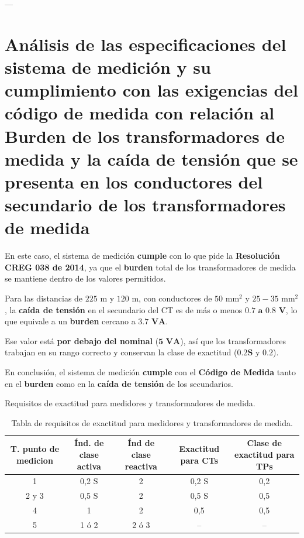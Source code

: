 ---
\section{Análisis de las especificaciones del sistema de medición y su cumplimiento con las exigencias del código de medida con relación al Burden de los transformadores de medida y la caída de tensión que se presenta en los conductores del secundario de los transformadores de medida}

En este caso, el sistema de medición \textbf{cumple} con lo que pide la \textbf{Resolución CREG 038 de 2014}, ya que el \textbf{burden} total de los transformadores de medida se mantiene dentro de los valores permitidos.

Para las distancias de $225 \text{ m}$ y $120 \text{ m}$, con conductores de $50 \text{ mm}^2$ y $25-35 \text{ mm}^2$, la \textbf{caída de tensión} en el secundario del CT es de más o menos $\mathbf{0.7 \text{ a } 0.8 \text{ V}}$, lo que equivale a un \textbf{burden} cercano a $\mathbf{3.7 \text{ VA}}$.

Ese valor está \textbf{por debajo del nominal} ($\mathbf{5 \text{ VA}}$), así que los transformadores trabajan en su rango correcto y conservan la clase de exactitud ($\mathbf{0.2S}$ y $\mathbf{0.2}$).

En conclusión, el sistema de medición \textbf{cumple} con el \textbf{Código de Medida} tanto en el \textbf{burden} como en la \textbf{caída de tensión} de los secundarios.





\begin{table}[t]
  \centering
  \small %
  \caption{Requisitos de exactitud para medidores y transformadores de medida.}
  \label{tab:requisitos_exactitud}
  \begin{tabular}{ccccc}
    \toprule
    \textbf{T. punto de medicion} & \textbf{Índ. de clase activa} & \textbf{Índ de clase reactiva} & \textbf{Exactitud para CTs} & \textbf{Clase de exactitud para TPs} \\
    \midrule
    1 & 0,2 S & 2 & 0,2 S & 0,2 \\
    2 y 3 & 0,5 S & 2 & 0,5 S & 0,5 \\
    4 & 1 & 2 & 0,5 & 0,5 \\
    5 & 1 ó 2 & 2 ó 3 & -- & -- \\
    \bottomrule
  \end{tabular}
  \caption*{Tabla de requisitos de exactitud para medidores y transformadores de medida.}
\end{table}

